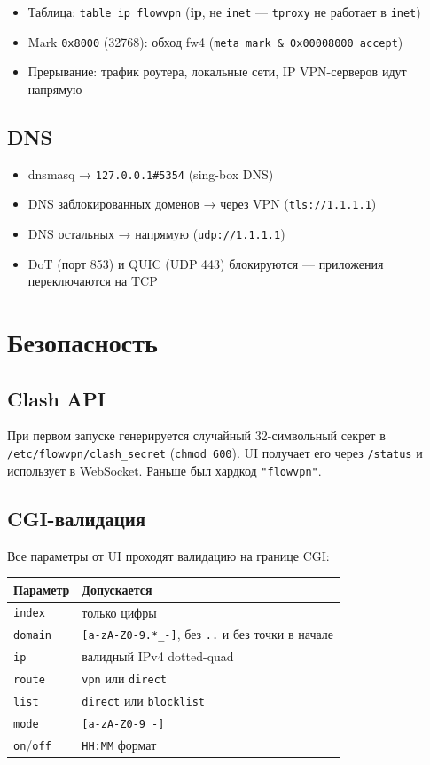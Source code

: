 \documentclass[11pt,a4paper]{article}
\begin{document}
\begin{itemize}
\item Таблица: \texttt{table ip flowvpn} (\textbf{ip}, не \texttt{inet} — \texttt{tproxy} не работает в \texttt{inet})
\item Mark \texttt{0x8000} (32768): обход fw4 (\texttt{meta mark \& 0x00008000 accept})
\item Прерывание: трафик роутера, локальные сети, IP VPN-серверов идут напрямую
\end{itemize}

\subsection{DNS}

\begin{itemize}
\item dnsmasq → \texttt{127.0.0.1\#5354} (sing-box DNS)
\item DNS заблокированных доменов → через VPN (\texttt{tls://1.1.1.1})
\item DNS остальных → напрямую (\texttt{udp://1.1.1.1})
\item DoT (порт 853) и QUIC (UDP 443) блокируются — приложения переключаются на TCP
\end{itemize}

\section{Безопасность}

\subsection{Clash API}

При первом запуске генерируется случайный 32-символьный секрет в \texttt{/etc/flowvpn/clash\_secret} (\texttt{chmod 600}). UI получает его через \texttt{/status} и использует в WebSocket. Раньше был хардкод \texttt{"flowvpn"}.

\subsection{CGI-валидация}

Все параметры от UI проходят валидацию на границе CGI:

\begin{tabularx}{\textwidth}{l X}
\toprule
\textbf{Параметр} & \textbf{Допускается} \\
\midrule
\texttt{index} & только цифры \\
\texttt{domain} & \texttt{[a-zA-Z0-9.*\_-]}, без \texttt{..} и без точки в начале \\
\texttt{ip} & валидный IPv4 dotted-quad \\
\texttt{route} & \texttt{vpn} или \texttt{direct} \\
\texttt{list} & \texttt{direct} или \texttt{blocklist} \\
\texttt{mode} & \texttt{[a-zA-Z0-9\_-]} \\
\texttt{on}/\texttt{off} & \texttt{HH:MM} формат \\
\bottomrule
\end{tabularx}
\end{document}
